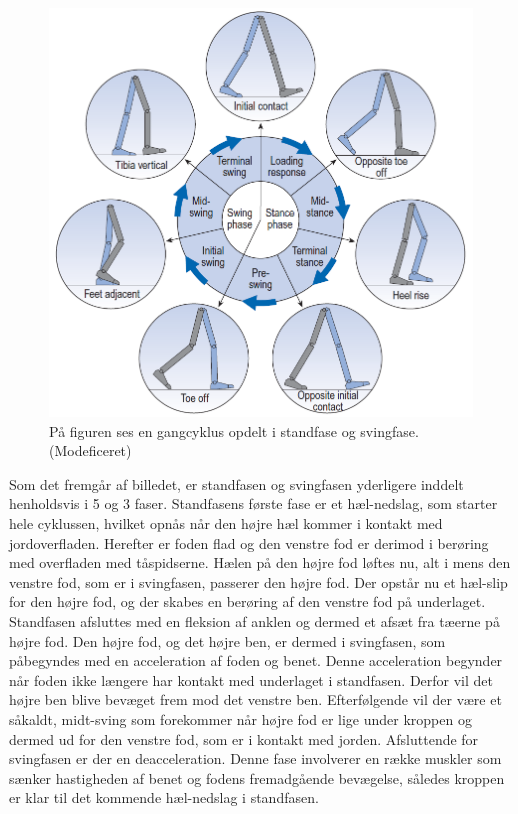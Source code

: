 \begin{figure}[H]
	\centering
	\includegraphics[scale=0.5]{figures/bProblemloesning/gang_cyklus2.png}
	\caption{På figuren ses en gangcyklus opdelt i standfase og svingfase. \citep{Whittle1990} (Modeficeret)}
	\label{fig:gang_cyklus}
\end{figure}
	
Som det fremgår af billedet, er standfasen og svingfasen yderligere inddelt henholdsvis i 5 og 3 faser. \newline
Standfasens første fase er et hæl-nedslag, som starter hele cyklussen, hvilket opnås når den højre hæl kommer i kontakt med jordoverfladen. Herefter er foden flad og den venstre fod er derimod i berøring med overfladen med tåspidserne. Hælen på den højre fod løftes nu, alt i mens den venstre fod, som er i svingfasen, passerer den højre fod. Der opstår nu et hæl-slip for den højre fod, og der skabes en berøring af den venstre fod på underlaget. Standfasen afsluttes med en fleksion af anklen og dermed et afsæt fra tæerne på højre fod. \newline
Den højre fod, og det højre ben, er dermed i svingfasen, som påbegyndes med en acceleration af foden og benet. Denne acceleration begynder når foden ikke længere har kontakt med underlaget i standfasen. Derfor vil det højre ben blive bevæget frem mod det venstre ben. Efterfølgende vil der være et såkaldt, midt-sving som forekommer når højre fod er lige under kroppen og dermed ud for den venstre fod, som er i kontakt med jorden. Afsluttende for svingfasen er der en deacceleration. Denne fase involverer en række muskler som sænker hastigheden af benet og fodens fremadgående bevægelse, således kroppen er klar til det kommende hæl-nedslag i standfasen.


